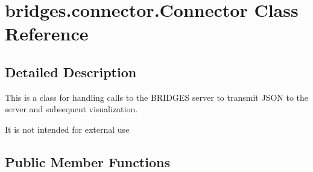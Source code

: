 \hypertarget{classbridges_1_1connector_1_1_connector}{}\section{bridges.\+connector.\+Connector Class Reference}
\label{classbridges_1_1connector_1_1_connector}


\subsection{Detailed Description}
This is a class for handling calls to the B\+R\+I\+D\+G\+ES server to transmit J\+S\+ON to the server and subsequent visualization. 

It is not intended for external use \subsection*{Public Member Functions}
